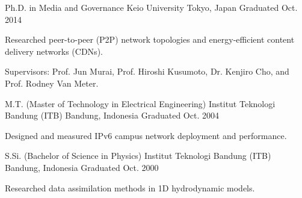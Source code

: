 

\begin{cventries}

  \cventry
    {Ph.D. in Media and Governance} %
    {Keio University} %
    {Tokyo, Japan} %
    {Graduated Oct. 2014} %
    {
      \begin{cvitems} %
        \item {Researched peer-to-peer (P2P) network topologies and energy-efficient content delivery networks (CDNs).}
        \item {Supervisors: Prof. Jun Murai, Prof. Hiroshi Kusumoto, Dr. Kenjiro Cho, and Prof. Rodney Van Meter.}
      \end{cvitems}
    }

  \cventry
    {M.T. (Master of Technology in Electrical Engineering)} %
    {Institut Teknologi Bandung (ITB)} %
    {Bandung, Indonesia} %
    {Graduated Oct. 2004} %
    {
      \begin{cvitems}
        \item {Designed and measured IPv6 campus network deployment and performance.}
      \end{cvitems}
    }

  \cventry
    {S.Si. (Bachelor of Science in Physics)} %
    {Institut Teknologi Bandung (ITB)} %
    {Bandung, Indonesia} %
    {Graduated Oct. 2000} %
    {
      \begin{cvitems}
        \item {Researched data assimilation methods in 1D hydrodynamic models.}
      \end{cvitems}
    }

\end{cventries}
